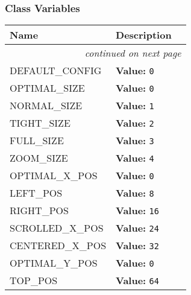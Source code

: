   \subsubsection{Class Variables}

    \vspace{-1cm}
\hspace{\varindent}\begin{longtable}{|p{\varnamewidth}|p{\vardescrwidth}|l}
\cline{1-2}
\cline{1-2} \centering \textbf{Name} & \centering \textbf{Description}& \\
\cline{1-2}
\endhead\cline{1-2}\multicolumn{3}{r}{\small\textit{continued on next page}}\\\endfoot\cline{1-2}
\endlastfoot\raggedright D\-E\-F\-A\-U\-L\-T\-\_\-C\-O\-N\-F\-I\-G\- & \raggedright \textbf{Value:} 
{\tt 0}&\\
\cline{1-2}
\raggedright O\-P\-T\-I\-M\-A\-L\-\_\-S\-I\-Z\-E\- & \raggedright \textbf{Value:} 
{\tt 0}&\\
\cline{1-2}
\raggedright N\-O\-R\-M\-A\-L\-\_\-S\-I\-Z\-E\- & \raggedright \textbf{Value:} 
{\tt 1}&\\
\cline{1-2}
\raggedright T\-I\-G\-H\-T\-\_\-S\-I\-Z\-E\- & \raggedright \textbf{Value:} 
{\tt 2}&\\
\cline{1-2}
\raggedright F\-U\-L\-L\-\_\-S\-I\-Z\-E\- & \raggedright \textbf{Value:} 
{\tt 3}&\\
\cline{1-2}
\raggedright Z\-O\-O\-M\-\_\-S\-I\-Z\-E\- & \raggedright \textbf{Value:} 
{\tt 4}&\\
\cline{1-2}
\raggedright O\-P\-T\-I\-M\-A\-L\-\_\-X\-\_\-P\-O\-S\- & \raggedright \textbf{Value:} 
{\tt 0}&\\
\cline{1-2}
\raggedright L\-E\-F\-T\-\_\-P\-O\-S\- & \raggedright \textbf{Value:} 
{\tt 8}&\\
\cline{1-2}
\raggedright R\-I\-G\-H\-T\-\_\-P\-O\-S\- & \raggedright \textbf{Value:} 
{\tt 16}&\\
\cline{1-2}
\raggedright S\-C\-R\-O\-L\-L\-E\-D\-\_\-X\-\_\-P\-O\-S\- & \raggedright \textbf{Value:} 
{\tt 24}&\\
\cline{1-2}
\raggedright C\-E\-N\-T\-E\-R\-E\-D\-\_\-X\-\_\-P\-O\-S\- & \raggedright \textbf{Value:} 
{\tt 32}&\\
\cline{1-2}
\raggedright O\-P\-T\-I\-M\-A\-L\-\_\-Y\-\_\-P\-O\-S\- & \raggedright \textbf{Value:} 
{\tt 0}&\\
\cline{1-2}
\raggedright T\-O\-P\-\_\-P\-O\-S\- & \raggedright \textbf{Value:} 
{\tt 64}&\\
\cline{1-2}

\end{longtable}
